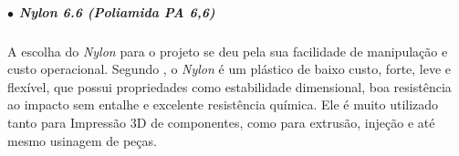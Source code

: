 


\subparagraph*{$\bullet$ Nylon 6.6 (Poliamida PA 6,6)} \hfill

A escolha do \textit{Nylon} para o projeto se deu pela sua facilidade de manipulação e custo operacional. Segundo \cite{Imp3D_Polimeros}, o \textit{Nylon} é um plástico de baixo custo, forte, leve e flexível, que possui propriedades como estabilidade dimensional, boa resistência ao impacto sem entalhe e excelente resistência química. Ele é muito utilizado tanto para Impressão 3D de componentes, como para extrusão, injeção e até mesmo usinagem de peças.

